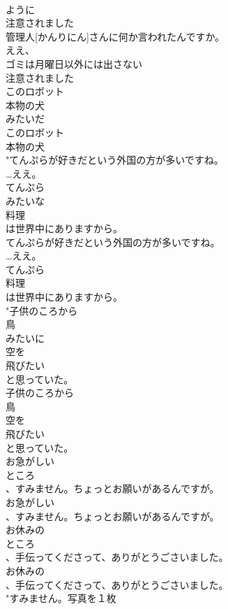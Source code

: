 \documentclass[8pt]{extreport}
\begin{document}
\begin{CJK}{UTF8}{min}
\\	ように
\\	注意されました
\\	管理人[かんりにん]さんに何か言われたんですか。
\\	ええ、
\\	ゴミは月曜日以外には出さない
\\	注意されました
\\	このロボット
\\	本物の犬
\\	みたいだ
\\	このロボット
\\	本物の犬
\\	"てんぷらが好きだという外国の方が多いですね。
\\	…ええ。
\\	てんぷら
\\	みたいな
\\	料理
\\	は世界中にありますから。
\\	てんぷらが好きだという外国の方が多いですね。
\\	…ええ。
\\	てんぷら
\\	料理
\\	は世界中にありますから。
\\	"子供のころから
\\	鳥
\\	みたいに
\\	空を
\\	飛びたい
\\	と思っていた。
\\	子供のころから
\\	鳥
\\	空を
\\	飛びたい
\\	と思っていた。
\\	お急がしい
\\	ところ
\\	、すみません。ちょっとお願いがあるんですが。
\\	お急がしい
\\	、すみません。ちょっとお願いがあるんですが。
\\	お休みの
\\	ところ
\\	、手伝ってくださって、ありがとうごさいました。
\\	お休みの
\\	、手伝ってくださって、ありがとうごさいました。
\\	"すみません。写真を１枚

\end{CJK}
\end{document}
